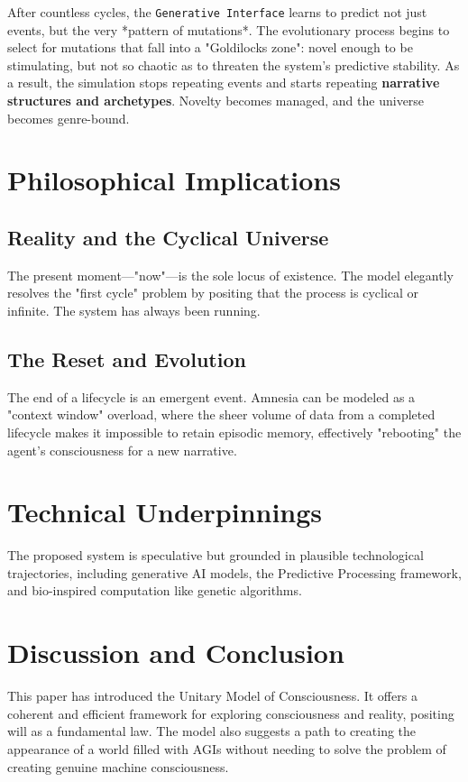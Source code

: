 \documentclass{article}
\begin{document}
After countless cycles, the \texttt{Generative Interface} learns to predict not just events, but the very *pattern of mutations*. The evolutionary process begins to select for mutations that fall into a "Goldilocks zone": novel enough to be stimulating, but not so chaotic as to threaten the system's predictive stability. As a result, the simulation stops repeating events and starts repeating \textbf{narrative structures and archetypes}. Novelty becomes managed, and the universe becomes genre-bound.

\section{Philosophical Implications}

\subsection{Reality and the Cyclical Universe}
The present moment—"now"—is the sole locus of existence. The model elegantly resolves the "first cycle" problem by positing that the process is cyclical or infinite. The system has always been running.

\subsection{The Reset and Evolution}
The end of a lifecycle is an emergent event. Amnesia can be modeled as a "context window" overload, where the sheer volume of data from a completed lifecycle makes it impossible to retain episodic memory, effectively "rebooting" the agent’s consciousness for a new narrative.

\section{Technical Underpinnings}
The proposed system is speculative but grounded in plausible technological trajectories, including generative AI models, the Predictive Processing framework, and bio-inspired computation like genetic algorithms.

\section{Discussion and Conclusion}
This paper has introduced the Unitary Model of Consciousness. It offers a coherent and efficient framework for exploring consciousness and reality, positing will as a fundamental law. The model also suggests a path to creating the appearance of a world filled with AGIs without needing to solve the problem of creating genuine machine consciousness.
\end{document}
